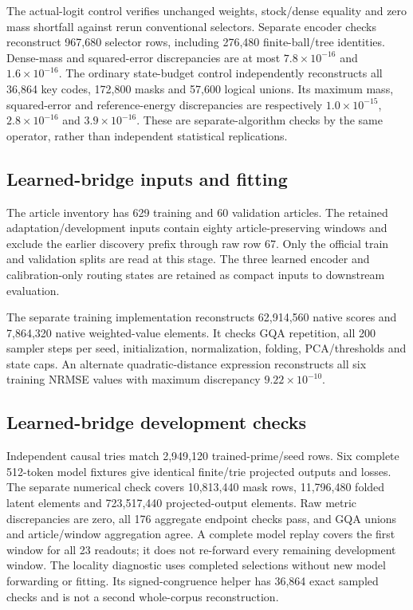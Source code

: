 \documentclass[11pt]{article}
\begin{document}
The actual-logit control verifies unchanged weights, stock/dense equality
and zero mass shortfall against rerun conventional selectors. Separate
encoder checks reconstruct 967,680 selector rows, including 276,480
finite-ball/tree identities. Dense-mass and squared-error discrepancies
are at most \(7.8\times10^{-16}\) and \(1.6\times10^{-16}\).
The ordinary state-budget control independently reconstructs all 36,864
key codes, 172,800 masks and 57,600 logical unions. Its maximum mass,
squared-error and reference-energy discrepancies are respectively
\(1.0\times10^{-15}\), \(2.8\times10^{-16}\) and
\(3.9\times10^{-16}\). These are separate-algorithm checks by the same
operator, rather than independent statistical replications.

\subsection{Learned-bridge inputs and fitting}
\label{app:learned-record}

The article inventory has 629 training and 60 validation articles.
The retained adaptation/development inputs contain eighty article-preserving
windows and exclude the earlier discovery prefix through raw row 67.
Only the official train and validation splits are read at this stage.
The three learned encoder and calibration-only routing states are retained
as compact inputs to downstream evaluation.

The separate training implementation reconstructs 62,914,560 native scores
and 7,864,320 native weighted-value elements. It checks GQA repetition,
all 200 sampler steps per seed, initialization, normalization, folding,
PCA/thresholds and state caps. An alternate quadratic-distance expression
reconstructs all six training NRMSE values with maximum discrepancy
\(9.22\times10^{-10}\).

\subsection{Learned-bridge development checks}
\label{app:learned-development}

Independent causal tries match 2,949,120 trained-prime/seed rows.
Six complete 512-token model fixtures give identical finite/trie projected
outputs and losses. The separate numerical check covers 10,813,440 mask
rows, 11,796,480 folded latent elements and 723,517,440 projected-output
elements. Raw metric discrepancies are zero, all 176 aggregate endpoint
checks pass, and GQA unions and article/window aggregation agree.
A complete model replay covers the first window for all 23 readouts;
it does not re-forward every remaining development window.
The locality diagnostic uses completed selections without new model
forwarding or fitting. Its signed-congruence helper has 36,864 exact
sampled checks and is not a second whole-corpus reconstruction.
\end{document}
